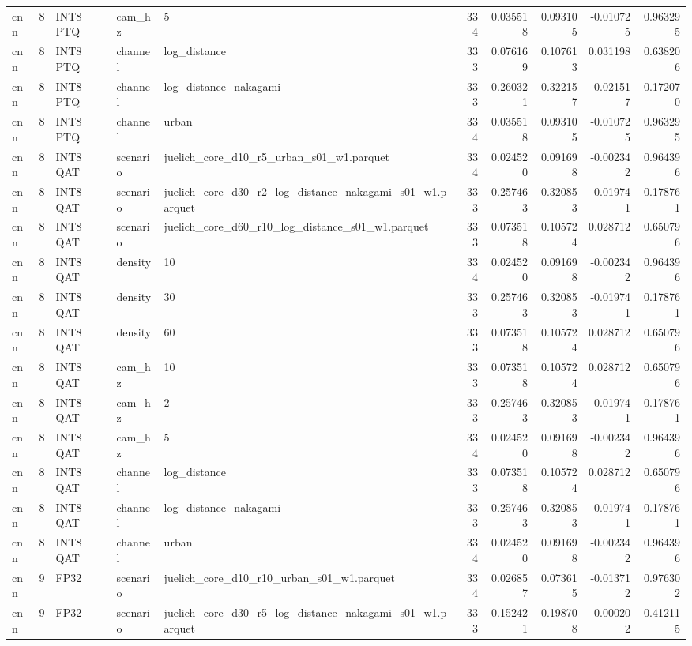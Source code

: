 \begin{tabular}{lrlllrrrrr}
cnn & 8 & INT8 PTQ & cam\_hz & 5 & 334 & 0.035518 & 0.093105 & -0.010725 & 0.963295 \\
cnn & 8 & INT8 PTQ & channel & log\_distance & 333 & 0.076169 & 0.107613 & 0.031198 & 0.638206 \\
cnn & 8 & INT8 PTQ & channel & log\_distance\_nakagami & 333 & 0.260321 & 0.322157 & -0.021517 & 0.172070 \\
cnn & 8 & INT8 PTQ & channel & urban & 334 & 0.035518 & 0.093105 & -0.010725 & 0.963295 \\
cnn & 8 & INT8 QAT & scenario & juelich\_core\_d10\_r5\_urban\_s01\_w1.parquet & 334 & 0.024520 & 0.091698 & -0.002342 & 0.964396 \\
cnn & 8 & INT8 QAT & scenario & juelich\_core\_d30\_r2\_log\_distance\_nakagami\_s01\_w1.parquet & 333 & 0.257463 & 0.320853 & -0.019741 & 0.178761 \\
cnn & 8 & INT8 QAT & scenario & juelich\_core\_d60\_r10\_log\_distance\_s01\_w1.parquet & 333 & 0.073518 & 0.105724 & 0.028712 & 0.650796 \\
cnn & 8 & INT8 QAT & density & 10 & 334 & 0.024520 & 0.091698 & -0.002342 & 0.964396 \\
cnn & 8 & INT8 QAT & density & 30 & 333 & 0.257463 & 0.320853 & -0.019741 & 0.178761 \\
cnn & 8 & INT8 QAT & density & 60 & 333 & 0.073518 & 0.105724 & 0.028712 & 0.650796 \\
cnn & 8 & INT8 QAT & cam\_hz & 10 & 333 & 0.073518 & 0.105724 & 0.028712 & 0.650796 \\
cnn & 8 & INT8 QAT & cam\_hz & 2 & 333 & 0.257463 & 0.320853 & -0.019741 & 0.178761 \\
cnn & 8 & INT8 QAT & cam\_hz & 5 & 334 & 0.024520 & 0.091698 & -0.002342 & 0.964396 \\
cnn & 8 & INT8 QAT & channel & log\_distance & 333 & 0.073518 & 0.105724 & 0.028712 & 0.650796 \\
cnn & 8 & INT8 QAT & channel & log\_distance\_nakagami & 333 & 0.257463 & 0.320853 & -0.019741 & 0.178761 \\
cnn & 8 & INT8 QAT & channel & urban & 334 & 0.024520 & 0.091698 & -0.002342 & 0.964396 \\
cnn & 9 & FP32 & scenario & juelich\_core\_d10\_r10\_urban\_s01\_w1.parquet & 334 & 0.026857 & 0.073615 & -0.013712 & 0.976302 \\
cnn & 9 & FP32 & scenario & juelich\_core\_d30\_r5\_log\_distance\_nakagami\_s01\_w1.parquet & 333 & 0.152421 & 0.198708 & -0.000202 & 0.412115 \\

\end{tabular}
